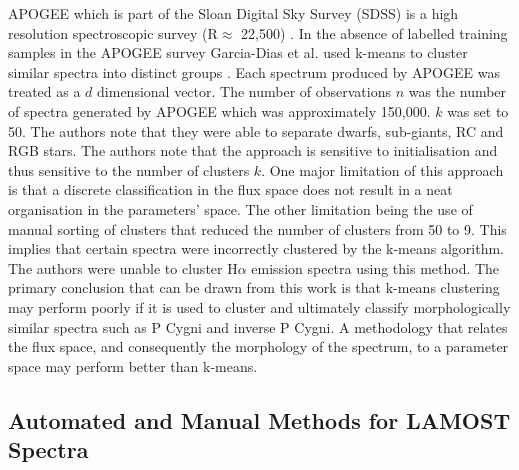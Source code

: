 APOGEE which is part of the Sloan Digital Sky Survey (SDSS) is a high resolution spectroscopic survey (R$\approx$ 22,500) \cite{eisenstein2001spectroscopic,blanton2017sloan}. In the absence of labelled training samples in the APOGEE survey Garcia-Dias et al. used k-means to cluster similar spectra into distinct groups \cite{garcia2018machine}. Each spectrum produced by APOGEE was treated as a $d$ dimensional vector. The number of observations $n$ was the number of spectra generated by APOGEE which was approximately 150,000. $k$ was set to 50. The authors note that they were able to separate dwarfs, sub-giants, RC and RGB stars. The authors note that the approach is sensitive to initialisation and thus sensitive to the number of clusters $k$. One major limitation of this approach is that a discrete classification in the flux space does not result in a neat organisation in the parameters' space. The other limitation being the use of manual sorting of clusters that reduced the number of clusters from 50 to 9. This implies that certain spectra were incorrectly clustered by the k-means algorithm. The authors were unable to cluster H$\alpha$ emission spectra using this method. The primary conclusion that can be drawn from this work is that k-means clustering may perform poorly if it is used to cluster and ultimately classify morphologically similar spectra such as P Cygni and inverse P Cygni. A methodology that relates the flux space, and consequently the morphology of the spectrum, to a parameter space may perform better than k-means. 

\subsection{Automated and Manual Methods for LAMOST Spectra}

